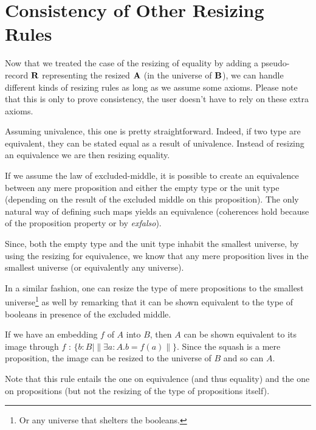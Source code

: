\documentclass[a4paper,english]{lipics-utf8x}
\begin{document}
  \section{Consistency of Other Resizing Rules}

  Now that we treated the case of the resizing of equality by adding a
  pseudo-record $\operatorname{\mathbf{R}}$ representing the resized $\operatorname{\mathbf{A}}$ (\ie in the universe of
  $\operatorname{\mathbf{B}}$), we can handle different kinds of resizing rules as long as we assume
  some axioms.
  Please note that this is only to prove consistency, the user doesn't have to
  rely on these extra axioms.


  Assuming univalence, this one is pretty straightforward.
  Indeed, if two type are equivalent,
  they can be stated equal as a result of univalence. Instead of resizing an
  equivalence we are then resizing equality.


  If we assume the law of excluded-middle, it is possible to create an
  equivalence between any mere proposition and either the empty type or the
  unit type (depending on the result of the excluded middle on this
  proposition). The only natural way of defining such maps yields an equivalence
  (coherences hold because of the proposition property or by \emph{exfalso}).

  Since, both the empty type and the unit type inhabit the smallest universe,
  by using the resizing for equivalence, we know that any mere proposition lives
  in the smallest universe (or equivalently any universe).

  In a similar fashion, one can resize the type of mere propositions to the
  smallest universe\footnote{Or any universe that shelters the booleans.} as
  well by remarking that it can be shown equivalent to
  the type of booleans in presence of the excluded middle.


  If we have an embedding $f$ of $A$ into $B$, then $A$ can be shown equivalent
  to its image through $f$ : $\{ b : B \mid \| \exists a:A. b = f(a) \| \}$.
  Since the squash is a mere proposition, the image can be resized to the
  universe of $B$ and so can $A$.

  Note that this rule entails the one on equivalence (and thus equality) and
  the one on propositions (but not the resizing of the type of propositions
  itself).
\end{document}
